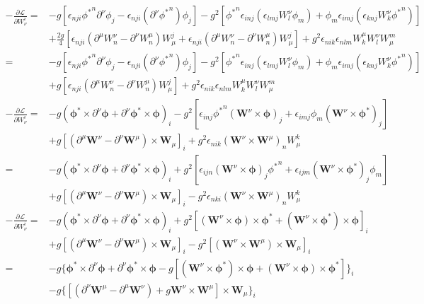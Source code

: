 \begin{align}
  -\frac{\partial\mathcal{L}}{\partial W^i_\nu}=&-g\left[\epsilon_{nji}{\phi^*}^n \partial^\nu\phi_j-\epsilon_{nji}\left(\partial^\nu{\phi^*}^n\right)\phi_j\right]
-g^2[{\phi^*}^n\epsilon_{inj}(\epsilon_{lmj}W^\nu_l \phi_m)+\phi_m\epsilon_{imj}(\epsilon_{knj}W^\nu_k {\phi^*}^n)]\nonumber\\
&+\frac{2g}{4}[\epsilon_{nji}(\partial^\mu W^\nu_n-\partial^\nu W^\mu_n)W_\mu^j+\epsilon_{nji}(\partial^\mu W^\nu_n-\partial^\nu W^\mu_n)W^j_\mu]
+g^2 \epsilon_{nik}\epsilon_{nlm}W^\mu_k W^\nu_l W_\mu^m\nonumber\\
  =&-g\left[\epsilon_{nji}{\phi^*}^n \partial^\nu\phi_j-\epsilon_{nji}\left(\partial^\nu{\phi^*}^n\right)\phi_j\right]
-g^2[{\phi^*}^n\epsilon_{inj}(\epsilon_{lmj}W^\nu_l \phi_m)+\phi_m\epsilon_{imj}(\epsilon_{knj}W^\nu_k {\phi^*}^n)]\nonumber\\
&+g[\epsilon_{nji}(\partial^\mu W^\nu_n-\partial^\nu W^\mu_n)W_\mu^j]
+g^2 \epsilon_{nik}\epsilon_{nlm}W^\mu_k W^\nu_l W_\mu^m\nonumber
\end{align}
\begin{align}
  -\frac{\partial\mathcal{L}}{\partial W^i_\nu}=&  
  -g(\boldsymbol{\phi}^*\times\partial^\nu\boldsymbol{\phi}+\partial^\nu\boldsymbol{\phi}^*\times\boldsymbol{\phi})_i
  -g^2[\epsilon_{inj}{\phi^*}^n(\mathbf{W}^\nu\times\boldsymbol{\phi})_j+\epsilon_{imj}\phi_m(\mathbf{W}^\nu\times\boldsymbol{\phi}^*)_j]\nonumber\\
  &+g[(\partial^\mu  \mathbf{W}^\nu -\partial^\nu \mathbf{W}^\mu)\times\mathbf{W}_\mu]_i
 +g^2 \epsilon_{nik}(\mathbf{W}^\nu \times\mathbf{W}^\mu)_n W^k_\mu\nonumber\\
=&-g(\boldsymbol{\phi}^*\times\partial^\nu\boldsymbol{\phi}+\partial^\nu\boldsymbol{\phi}^*\times\boldsymbol{\phi})_i
+g^2[\epsilon_{ijn}(\mathbf{W}^\nu\times\boldsymbol{\phi})_j{\phi^*}^n+\epsilon_{ijm}(\mathbf{W}^\nu\times\boldsymbol{\phi}^*)_j\phi_m]\nonumber\\
  &+g[(\partial^\mu  \mathbf{W}^\nu -\partial^\nu \mathbf{W}^\mu)\times\mathbf{W}_\mu]_i
 -g^2 \epsilon_{nki}(\mathbf{W}^\nu \times\mathbf{W}^\mu)_n W^k_\mu\nonumber
\end{align}
\begin{align}
  -\frac{\partial\mathcal{L}}{\partial W^i_\nu}
  =&-g(\boldsymbol{\phi}^*\times\partial^\nu\boldsymbol{\phi}+\partial^\nu\boldsymbol{\phi}^*\times\boldsymbol{\phi})_i
  +g^2[(\mathbf{W}^\nu\times\boldsymbol{\phi})\times\boldsymbol{\phi}^*+(\mathbf{W}^\nu\times\boldsymbol{\phi}^*)\times\boldsymbol{\phi}]_i\nonumber\\
  &+g[(\partial^\mu  \mathbf{W}^\nu -\partial^\nu \mathbf{W}^\mu)\times\mathbf{W}_\mu]_i
  -g^2 [(\mathbf{W}^\nu \times\mathbf{W}^\mu)\times\mathbf{W}_\mu]_i\nonumber\\
=&-g\{\boldsymbol{\phi}^*\times\partial^\nu\boldsymbol{\phi}+\partial^\nu\boldsymbol{\phi}^*\times\boldsymbol{\phi}
  -g[(\mathbf{W}^\nu\times\boldsymbol{\phi}^*)\times\boldsymbol{\phi}+(\mathbf{W}^\nu\times\boldsymbol{\phi})\times\boldsymbol{\phi}^*]\}_i\nonumber\\
  &-g\{[(\partial^\nu \mathbf{W}^\mu-\partial^\mu\mathbf{W}^\nu)+g\mathbf{W}^\nu \times\mathbf{W}^\mu]\times\mathbf{W}_\mu\}_i
\nonumber
\end{align}
